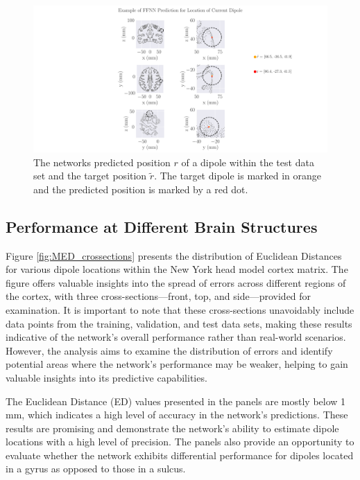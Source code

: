 \documentclass[a4paper, UKenglish, 11pt]{uiomaster}
\begin{document}
\begin{figure}
  \hspace*{-10cm}
  \includegraphics[width=28cm]{figures/FFNN_single_dipole_prediction.pdf}
  \caption{The networks predicted position $r$ of a dipole within the test data set and the target position $\tilde{r}$. The target dipole is marked in orange and the predicted position is marked by a red dot.}
  \label{fig:prediction_FFNN_example}
\end{figure}

\subsection{Performance at Different Brain Structures}

Figure \ref{fig:MED_crossections} presents the distribution of Euclidean Distances for various dipole locations within the New York head model cortex matrix. The figure offers valuable insights into the spread of errors across different regions of the cortex, with three cross-sections—front, top, and side—provided for examination. It is important to note that these cross-sections unavoidably include data points from the training, validation, and test data sets, making these results indicative of the network's overall performance rather than real-world scenarios. However, the analysis aims to examine the distribution of errors and identify potential areas where the network's performance may be weaker, helping to gain valuable insights into its predictive capabilities.

The Euclidean Distance (ED) values presented in the panels are mostly below 1 mm, which indicates a high level of accuracy in the network's predictions. These results are promising and demonstrate the network's ability to estimate dipole locations with a high level of precision. The panels also provide an opportunity to evaluate whether the network exhibits differential performance for dipoles located in a gyrus as opposed to those in a sulcus.
\end{document}
